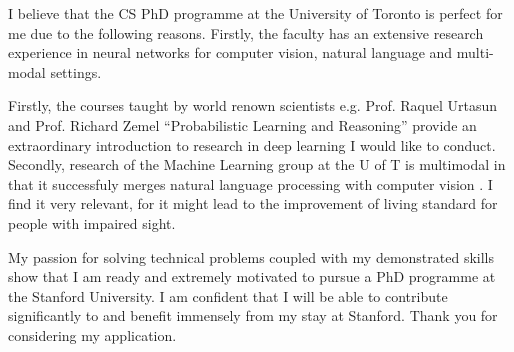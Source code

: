 \documentclass[12pt]{article}
\begin{document}
I believe that the CS PhD programme at the University of Toronto is perfect for me due to the following reasons. Firstly, the faculty has an extensive research experience in neural networks for computer vision, natural language and multi-modal settings. 

Firstly, the courses taught by world renown scientists e.g. Prof. Raquel Urtasun and Prof. Richard Zemel ``Probabilistic Learning and Reasoning'' provide an extraordinary introduction to research in deep learning I would like to conduct. Secondly, research of the Machine Learning group at the U of T is multimodal in that it successfuly merges natural language processing with computer vision \cite{show}. I find it very relevant, for it might lead to the improvement of living standard for people with impaired sight.

My passion for solving technical problems coupled with my demonstrated skills show that I am ready and extremely motivated to pursue a PhD programme at the Stanford University. I am confident that I will be able to contribute significantly to and benefit immensely from my stay at Stanford. Thank you for considering my application.



\end{document}
